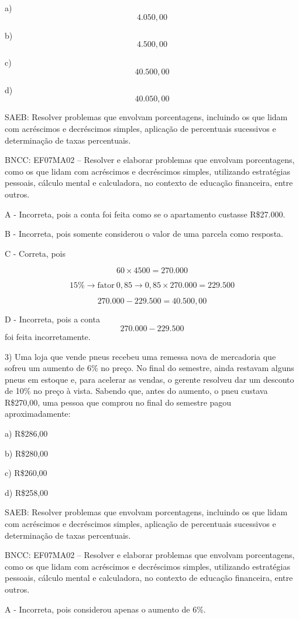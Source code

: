 a) \[4.050,00\]

b) \[4.500,00\]

c) \[40.500,00\]

d) \[40.050,00\]

SAEB: Resolver problemas que envolvam porcentagens, incluindo os que
lidam com acréscimos e decréscimos simples, aplicação de percentuais
sucessivos e determinação de taxas percentuais.

BNCC: EF07MA02 -- Resolver e elaborar problemas que envolvam
porcentagens, como os que lidam com acréscimos e decréscimos simples,
utilizando estratégias pessoais, cálculo mental e calculadora, no
contexto de educação financeira, entre outros.

A - Incorreta, pois a conta foi feita como se o apartamento custasse
R\$27.000.

B - Incorreta, pois somente considerou o valor de uma parcela como
resposta.

C - Correta, pois

\[60 \times 4500 = 270.000\]

\[15\% \rightarrow \text{fator}\ 0,85 \rightarrow 0,85 \times 270.000 = 229.500\]

\[270.000 - 229.500 = 40.500,00\]

D - Incorreta, pois a conta \[270.000 - 229.500\] foi feita
incorretamente.

3) Uma loja que vende pneus recebeu uma remessa nova de mercadoria que
sofreu um aumento de 6\% no preço. No final do semestre, ainda restavam
alguns pneus em estoque e, para acelerar as vendas, o gerente resolveu
dar um desconto de 10\% no preço à vista. Sabendo que, antes do aumento,
o pneu custava R\$270,00, uma pessoa que comprou no final do semestre
pagou aproximadamente:

a) R\$286,00

b) R\$280,00

c) R\$260,00

d) R\$258,00

SAEB: Resolver problemas que envolvam porcentagens, incluindo os que
lidam com acréscimos e decréscimos simples, aplicação de percentuais
sucessivos e determinação de taxas percentuais.

BNCC: EF07MA02 -- Resolver e elaborar problemas que envolvam
porcentagens, como os que lidam com acréscimos e decréscimos simples,
utilizando estratégias pessoais, cálculo mental e calculadora, no
contexto de educação financeira, entre outros.

A - Incorreta, pois considerou apenas o aumento de 6\%.

